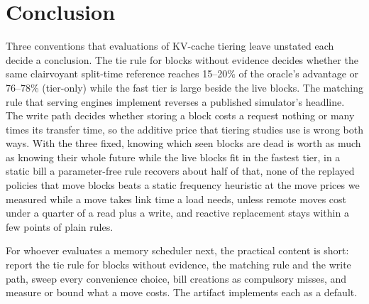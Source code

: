 \section{Conclusion}
\label{sec:conclusion}
Three conventions that evaluations of KV-cache tiering leave unstated each decide a conclusion. The tie rule
for blocks without evidence decides whether the same clairvoyant split-time reference reaches 15--20\% of
the oracle's advantage or 76--78\% (tier-only) while the fast tier is large beside the live blocks. The matching rule that serving engines implement reverses a published
simulator's headline. The write path decides whether storing a block costs a request nothing or many times
its transfer time, so the additive price that tiering studies use is wrong both ways. With the three fixed,
knowing which seen blocks are dead is worth as much as knowing their whole future while the live blocks fit
in the fastest tier, in a static bill a parameter-free rule recovers about half of that, none of the replayed policies that
move blocks beats a static frequency heuristic at the move prices we measured while a move takes link time a load needs, unless
remote moves cost under a quarter of a read plus a write, and reactive replacement stays within a few points of plain rules.

For whoever evaluates a memory scheduler next, the practical content is short: report the tie rule for
blocks without evidence, the matching rule and the write path, sweep every convenience choice, bill
creations as compulsory misses, and measure or bound what a move costs. The artifact implements each as a
default.
